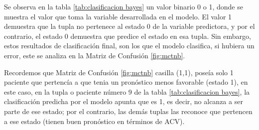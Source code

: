     Se observa en la tabla \ref{tab:clasificacion bayes} un valor binario 0 o 1, donde se muestra el valor que toma la variable desarrollada en el modelo. El valor 1 demuestra que la tupla no pertenece al estado 0 de la variable predictora, y por el contrario, el estado 0 demuestra que predice el estado en esa tupla. Sin embargo, estos resultados de clasificación final, son los que el modelo clasifica, si hubiera un error, este se analiza en la Matriz de Confusión \ref{fig:mctnb}.
\par Recordemos que Matriz de Confusión \ref{fig:mctnb} casilla (1,1), poseía solo 1 paciente que pertencía a que tenia un pronóstico menos favorable (estado 1), en este caso, en la tupla o paciente número 9 de la tabla \ref{tab:clasificacion bayes}, la clasificación predicha por el modelo apunta que es 1, es decir, no alcanza a ser parte de ese estado; por el contrario, las demás tuplas las reconoce que pertencen a ese estado (tienen buen pronóstico en términos de ACV).\\
    
    